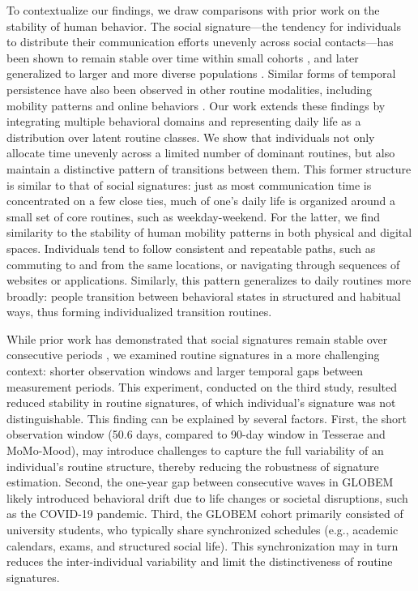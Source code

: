 \documentclass[pdflatex,sn-vancouver,Numbered]{bst/sn-jnl}%
\theoremstyle{thmstyleone}%
\theoremstyle{thmstyletwo}%
\theoremstyle{thmstylethree}%
\begin{document}
To contextualize our findings, we draw comparisons with prior work on the stability of human behavior. The social signature—the tendency for individuals to distribute their communication efforts unevenly across social contacts—has been shown to remain stable over time within small cohorts \cite{saramaki2014persistence}, and later generalized to larger and more diverse populations \cite{heydari2018multichannel, iniguezUniversalPatternsEgocentric2023}. Similar forms of temporal persistence have also been observed in other routine modalities, including mobility patterns \cite{alessandrettiUnderstandingInterplaySocial2018, alessandretti2020scales} and online behaviors \cite{kulshrestha2021web, malmi2016you}. Our work extends these findings by integrating multiple behavioral domains and representing daily life as a distribution over latent routine classes. We show that individuals not only allocate time unevenly across a limited number of dominant routines, but also maintain a distinctive pattern of transitions between them. This former structure is similar to that of social signatures: just as most communication time is concentrated on a few close ties, much of one’s daily life is organized around a small set of core routines, such as weekday-weekend. For the latter, we find similarity to the stability of human mobility patterns in both physical and digital spaces. Individuals tend to follow consistent and repeatable paths, such as commuting to and from the same locations, or navigating through sequences of websites or applications. Similarly, this pattern generalizes to daily routines more broadly: people transition between behavioral states in structured and habitual ways, thus forming individualized transition routines.

While prior work has demonstrated that social signatures remain stable over consecutive periods \cite{saramaki2014persistence}, we examined routine signatures in a more challenging context: shorter observation windows and larger temporal gaps between measurement periods. This experiment, conducted on the third study, resulted reduced stability in routine signatures, of which individual's signature was not distinguishable. This finding can be explained by several factors. First, the short observation window (50.6 days, compared to 90-day window in Tesserae and MoMo-Mood), may introduce challenges to capture the full variability of an individual's routine structure, thereby reducing the robustness of signature estimation. Second, the one-year gap between consecutive waves in GLOBEM likely introduced behavioral drift due to life changes or societal disruptions, such as the COVID-19 pandemic. Third, the GLOBEM cohort primarily consisted of university students, who typically share synchronized schedules (e.g., academic calendars, exams, and structured social life). This synchronization may in turn reduces the inter-individual variability and limit the distinctiveness of routine signatures.
\end{document}
